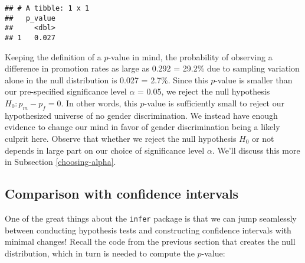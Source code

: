 \documentclass[
]{book}
\newenvironment{Shaded}{\begin{snugshade}}{\end{snugshade}}
\newcommand{\DataTypeTok}[1]{\textcolor[rgb]{0.13,0.29,0.53}{#1}}
\newcommand{\DecValTok}[1]{\textcolor[rgb]{0.00,0.00,0.81}{#1}}
\newcommand{\KeywordTok}[1]{\textcolor[rgb]{0.13,0.29,0.53}{\textbf{#1}}}
\newcommand{\NormalTok}[1]{#1}
\newcommand{\OperatorTok}[1]{\textcolor[rgb]{0.81,0.36,0.00}{\textbf{#1}}}
\newcommand{\StringTok}[1]{\textcolor[rgb]{0.31,0.60,0.02}{#1}}
\begin{document}
\begin{verbatim}
## # A tibble: 1 x 1
##   p_value
##     <dbl>
## 1   0.027
\end{verbatim}

Keeping the definition of a \(p\)-value in mind, the probability of observing a difference in promotion rates as large as 0.292 = 29.2\% due to sampling variation alone in the null distribution is 0.027 = 2.7\%. Since this \(p\)-value is smaller than our pre-specified significance level \(\alpha\) = 0.05, we reject the null hypothesis \(H_0: p_{m} - p_{f} = 0\). In other words, this \(p\)-value is sufficiently small to reject our hypothesized universe of no gender discrimination. We instead have enough evidence to change our mind in favor of gender discrimination being a likely culprit here. Observe that whether we reject the null hypothesis \(H_0\) or not depends in large part on our choice of significance level \(\alpha\). We'll discuss this more in Subsection \ref{choosing-alpha}.

\hypertarget{comparing-infer-workflows}{%
\subsection{Comparison with confidence intervals}\label{comparing-infer-workflows}}

One of the great things about the \texttt{infer} package is that we can jump seamlessly between conducting hypothesis tests and constructing confidence intervals with minimal changes! Recall the code from the previous section that creates the null distribution, which in turn is needed to compute the \(p\)-value:

\begin{Shaded}
\end{Shaded}
\end{document}
